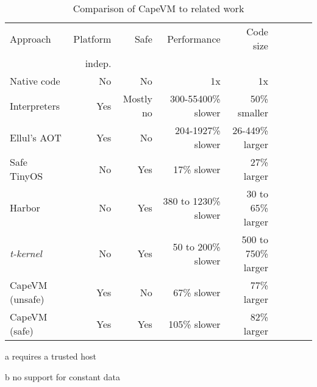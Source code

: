 \begin{table}
\caption{Comparison of CapeVM to related work}
\label{tbl-contribution-comparison}
    \begin{threeparttable}
    \begin{tabular}{lrrrrrrrr} %
    \toprule
    Approach          & Platform    & Safe               & Performance           & Code size                  \\
                      & indep.      &                    &                       &                            \\
    \midrule
    \midrule
    Native code       & No          & No                 & 1x                    & 1x                         \\
    Interpreters      & Yes         & Mostly no          & 300-55400\% slower    & ~50\% smaller \tnote{b}    \\ 
    Ellul's AOT       & Yes         & No                 & 204-1927\% slower     & 26-449\% larger \tnote{b}  \\
    Safe TinyOS       & No          & Yes \tnote{a}      & 17\% slower           & 27\% larger                \\
    Harbor            & No          & Yes                & 380 to 1230\% slower  & 30 to 65\% larger          \\
    \emph{t-kernel}   & No          & Yes                & 50 to 200\% slower    & 500 to 750\% larger        \\
    CapeVM (unsafe)   & Yes         & No                 & 67\% slower           & 77\% larger                \\ %
    CapeVM (safe)     & Yes         & Yes                & 105\% slower          & 82\% larger                \\ %
    \bottomrule
    \end{tabular}
    \begin{tablenotes}
        \item[a] requires a trusted host
        \item[b] no support for constant data
    \end{tablenotes}
    \end{threeparttable}
\end{table}
